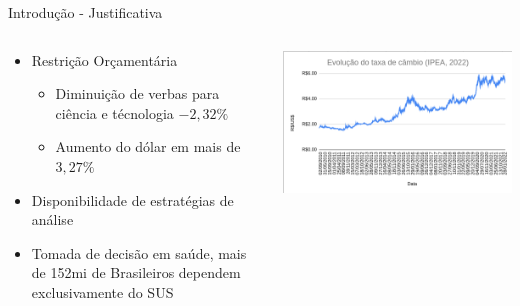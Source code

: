\documentclass[10pt,brazil]{beamer}
\theoremstyle{definition}
\begin{document}
\begin{frame}{Introdução - Justificativa}
  \begin{columns}
    \begin{column}{0.5\textwidth}
      \begin{itemize}
        \item Restrição Orçamentária
              \begin{itemize}
                \item Diminuição de verbas para ciência e técnologia $-2,32\%$
                \item Aumento do dólar em mais de $3,27\%$
              \end{itemize}
        \item Disponibilidade de estratégias de análise
        \item Tomada de decisão em saúde, mais de 152mi de Brasileiros dependem exclusivamente do SUS %
      \end{itemize}
    \end{column}
    \begin{column}{0.5\textwidth}  %
      \begin{center}
        \includegraphics[width=1\textwidth]{variacaodolar.png}
      \end{center}
    \end{column}
  \end{columns}
\end{frame}

\end{document}
